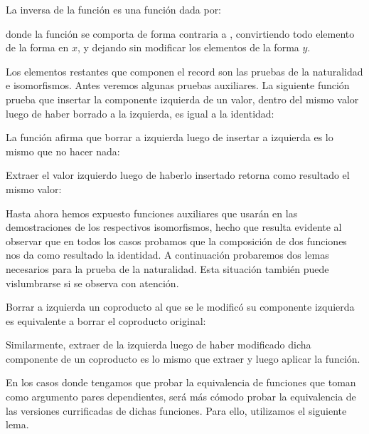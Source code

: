 

La inversa de la función \AgdaFunction{$\curry{\_}$} es una función \AgdaFunction{$\uncurry{\_}$} dada por:


donde la función  se comporta de forma contraria a , convirtiendo todo elemento de la forma  en  $x$, y dejando sin modificar los elementos de la forma  $y$.


Los elementos restantes que componen el record  son las pruebas de la naturalidad e isomorfismos. Antes veremos algunas pruebas auxiliares.
La siguiente función prueba que insertar la componente izquierda de un valor, dentro del mismo valor luego de haber borrado a la izquierda, es igual a la identidad:

La función  afirma que borrar a izquierda luego de insertar a izquierda es lo mismo que no hacer nada:

Extraer el valor izquierdo luego de haberlo insertado retorna como resultado el mismo valor: 


Hasta ahora hemos expuesto funciones auxiliares que usarán en las demostraciones de los respectivos isomorfismos, hecho que resulta evidente al observar que en todos los casos probamos que la composición de dos funciones nos da como resultado la identidad. A continuación probaremos dos lemas necesarios para la prueba de la naturalidad. Esta situación también puede vislumbrarse si se observa con atención. 

Borrar a izquierda un coproducto al que se le modificó su componente izquierda es equivalente a borrar el coproducto original:

Similarmente, extraer de la izquierda luego de haber modificado dicha componente de un coproducto es lo mismo que extraer y luego aplicar la función.

En los casos donde tengamos que probar la equivalencia de funciones que toman como argumento pares dependientes, será más cómodo probar la equivalencia de las versiones currificadas de dichas funciones. Para ello, utilizamos el siguiente lema.

